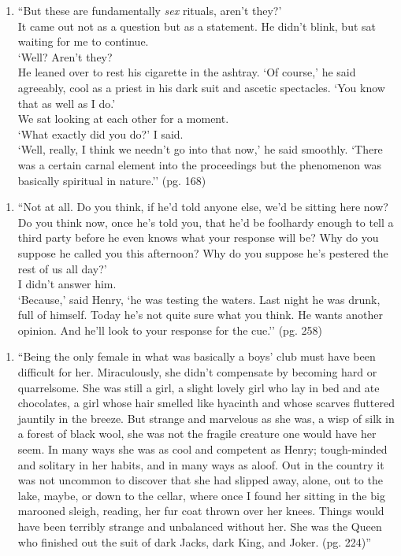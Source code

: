 \documentclass[11pt]{article}
\newcommand{\mi}{\hspace*{5mm}}
\newcommand{\psep}{\\ \mi}
\begin{document}
\begin{minipage}{\textwidth}
\begin{enumerate}[resume=main]
  \item \mi ``But these are fundamentally \textit{sex} rituals, aren't they?' \psep It came out not as a question but as a statement. He didn't blink, but sat waiting for me to continue. \psep `Well? Aren't they? \psep He leaned over to rest his cigarette in the ashtray. `Of course,' he said agreeably, cool as a priest in his dark suit and ascetic spectacles. `You know that as well as I do.' \psep We sat looking at each other for a moment. \psep `What exactly did you do?' I said. \psep `Well, really, I think we needn't go into that now,' he said smoothly. `There was a certain carnal element into the proceedings but the phenomenon was basically spiritual in nature.'' (pg. 168) \\
\end{enumerate}
\end{minipage}

\begin{minipage}{\textwidth}
\begin{enumerate}[resume=main]
  \item \mi ``Not at all. Do you think, if he'd told anyone else, we'd be sitting here now? Do you think now, once he's told you, that he'd be foolhardy enough to tell a third party before he even knows what your response will be? Why do you suppose he called you this afternoon? Why do you suppose he's pestered the rest of us all day?' \psep I didn't answer him. \psep `Because,' said Henry, `he was testing the waters. Last night he was drunk, full of himself. Today he's not quite sure what you think. He wants another opinion. And he'll look to your response for the cue.'' (pg. 258) \\
\end{enumerate}
\end{minipage}

\begin{minipage}{\textwidth}
\begin{enumerate}[resume=main]
  \item \mi ``Being the only female in what was basically a boys’ club must have been difficult for her. Miraculously, she didn’t compensate by becoming hard or quarrelsome. She was still a girl, a slight lovely girl who lay in bed and ate chocolates, a girl whose hair smelled like hyacinth and whose scarves fluttered jauntily in the breeze. But strange and marvelous as she was, a wisp of silk in a forest of black wool, she was not the fragile creature one would have her seem. In many ways she was as cool and competent as Henry; tough-minded and solitary in her habits, and in many ways as aloof. Out in the country it was not uncommon to discover that she had slipped away, alone, out to the lake, maybe, or down to the cellar, where once I found her sitting in the big marooned sleigh, reading, her fur coat thrown over her knees. Things would have been terribly strange and unbalanced without her. She was the Queen who finished out the suit of dark Jacks, dark King, and Joker. (pg. 224)''
\end{enumerate}
\end{minipage}
\end{document}
